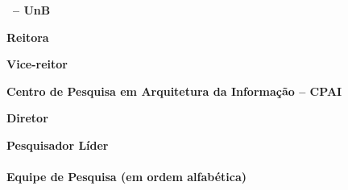 
{
\ABNTEXchapterfont\setlength{\parindent}{0cm}
\textsf{\textbf{\UnB\ -- UnB} }

{\scriptsize \textsf{\textbf{Reitora}}} \\ %
\textsc{\reitor}

{\scriptsize \textsf{\textbf{Vice-reitor}}}\\
\textsc{\vicereitor}


\vspace{0.8cm}

\textsf{\textbf{Centro de Pesquisa em Arquitetura da Informação -- CPAI}}

{\scriptsize \textsf{\textbf{Diretor}}}\\
\textsc{\diretorcpai}

\vfill
\textsf{\textbf{Pesquisador Líder}} \\
\textsc{\rtlider} \\

\textsf{\textbf{Equipe de Pesquisa (em ordem alfabética)}}

}
